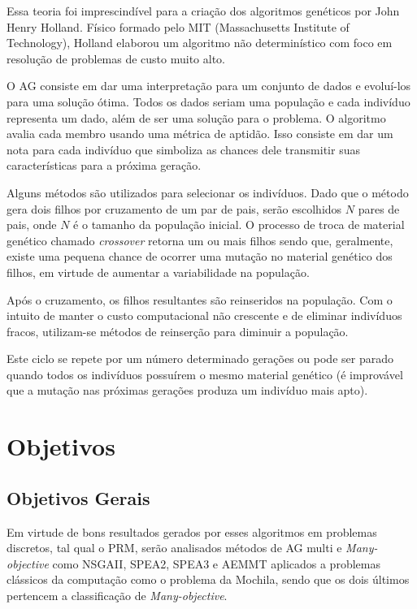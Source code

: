 \documentclass[]{article}
\begin{document}
	Essa teoria foi imprescindível para a criação dos algoritmos genéticos por John Henry Holland. Físico formado pelo MIT (Massachusetts Institute of Technology), Holland elaborou um algoritmo não determinístico com foco em resolução de problemas de custo muito alto.
	
	O AG consiste em dar uma interpretação para um conjunto de dados e evoluí-los para uma solução ótima. Todos os dados seriam uma população e cada indivíduo representa um dado, além de ser uma solução para o problema. O algoritmo avalia cada membro usando uma métrica de aptidão. Isso consiste em dar um nota para cada indivíduo que simboliza as chances dele transmitir suas características para a próxima geração.
	
	Alguns métodos são utilizados para selecionar os indivíduos. Dado que o método gera dois filhos por cruzamento de um par de pais, serão escolhidos $N$ pares de pais, onde $N$ é o tamanho da população inicial. O processo de troca de material genético chamado \textit{crossover} retorna um ou mais filhos sendo que, geralmente, existe uma pequena chance de ocorrer uma mutação no material genético dos filhos, em virtude de aumentar a variabilidade na população.
	
	Após o cruzamento, os filhos resultantes são reinseridos na população. Com o intuito de manter o custo computacional não crescente e de eliminar indivíduos fracos, utilizam-se métodos de reinserção para diminuir a população.
	
	Este ciclo se repete por um número determinado gerações ou pode ser parado quando todos os indivíduos possuírem o mesmo material genético (é improvável que a mutação nas próximas gerações produza um indivíduo mais apto). 
 	
	
\section{Objetivos}
\subsection{Objetivos Gerais}

	Em virtude de bons resultados gerados por esses algoritmos em problemas discretos, tal qual o PRM, serão analisados métodos de AG multi e \textit{Many-objective} como NSGAII\cite{NSGAII}, SPEA2\cite{SPEA2}, SPEA3 e AEMMT aplicados a problemas clássicos da computação como o problema da Mochila, sendo que os dois últimos pertencem a classificação de \textit{Many-objective}.
	
\end{document}
